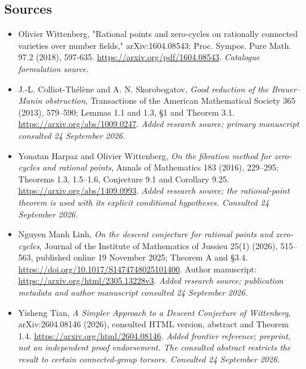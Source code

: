 \documentclass[11pt]{article}
\begin{document}
\subsection{Sources}
\begin{itemize}\raggedright
\item[\textnormal{[S1]}]\hypertarget{source:statement:1}{} Olivier Wittenberg, "Rational points and zero-cycles on rationally connected varieties over number fields," arXiv:1604.08543; Proc. Sympos. Pure Math. 97.2 (2018), 597-635.
\url{https://arxiv.org/pdf/1604.08543}.
{\small\textit{Catalogue formulation source.}}
\item[\textnormal{[E1]}]\hypertarget{extra:statement:1}{} J.-L. Colliot-Th\'el\`ene and A. N. Skorobogatov, \emph{Good reduction of the Brauer--Manin obstruction}, Transactions of the American Mathematical Society 365 (2013), 579--590; Lemmas 1.1 and 1.3, \S1 and Theorem 3.1. \url{https://arxiv.org/abs/1009.0247}.
{\small\textit{Added research source; primary manuscript consulted 24 September 2026.}}
\item[\textnormal{[E2]}]\hypertarget{extra:statement:2}{} Yonatan Harpaz and Olivier Wittenberg, \emph{On the fibration method for zero-cycles and rational points}, Annals of Mathematics 183 (2016), 229--295; Theorems 1.3, 1.5--1.6, Conjecture 9.1 and Corollary 9.25. \url{https://arxiv.org/abs/1409.0993}.
{\small\textit{Added research source; the rational-point theorem is used with its explicit conditional hypotheses. Consulted 24 September 2026.}}
\item[\textnormal{[E3]}]\hypertarget{extra:statement:3}{} Nguyen Manh Linh, \emph{On the descent conjecture for rational points and zero-cycles}, Journal of the Institute of Mathematics of Jussieu 25(1) (2026), 515--563, published online 19 November 2025; Theorem A and \S3.4. \url{https://doi.org/10.1017/S1474748025101400}. Author manuscript: \url{https://arxiv.org/html/2305.13228v3}.
{\small\textit{Added research source; publication metadata and author manuscript consulted 24 September 2026.}}
\item[\textnormal{[E4]}]\hypertarget{extra:statement:4}{} Yisheng Tian, \emph{A Simpler Approach to a Descent Conjecture of Wittenberg}, arXiv:2604.08146 (2026), consulted HTML version, abstract and Theorem 1.4. \url{https://arxiv.org/html/2604.08146}.
{\small\textit{Added frontier reference; preprint, not an independent proof endorsement. The consulted abstract restricts the result to certain connected-group torsors. Consulted 24 September 2026.}}
\end{itemize}
\end{document}
